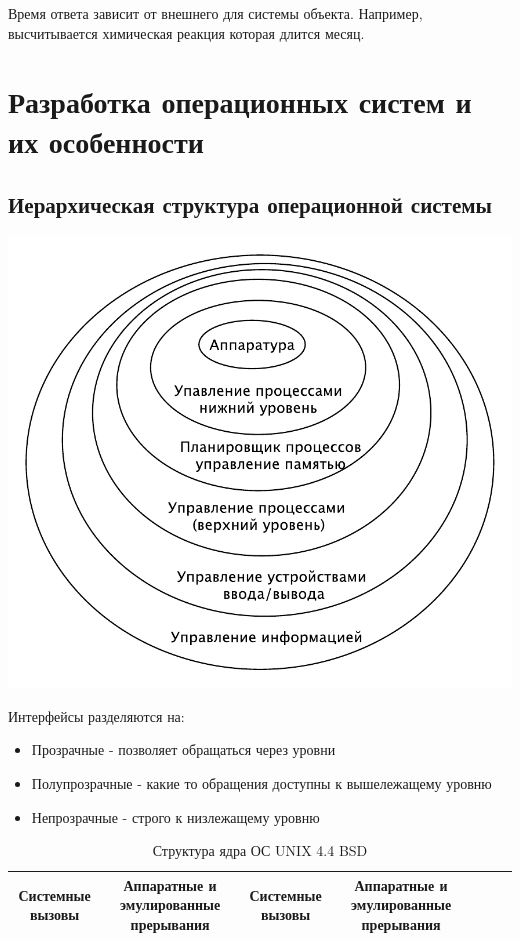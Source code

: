 \documentclass[a4paper, 14pt]{report}
\begin{document}
Время ответа зависит от внешнего для системы объекта. Например, высчитывается химическая реакция которая длится месяц.

\chapter{Разработка операционных систем и их особенности}

\section{Иерархическая структура операционной системы}

\begin{center}
    \includegraphics{os1}
\end{center}

Интерфейсы разделяются на:

\begin{itemize}
    \item Прозрачные - позволяет обращаться через уровни
    \item Полупрозрачные - какие то обращения доступны к вышележащему уровню
    \item Непрозрачные - строго к низлежащему уровню
\end{itemize}

\begin{table}
    \caption{Структура ядра ОС UNIX 4.4 BSD}
    \begin{center}
        \begin{tabular}{|c|c|c|c|c|c|c|c|c|}
            \hline
            \multicolumn{2}{|c|}{Системные вызовы} & Аппаратные и эмулированные прерывания & Системные вызовы & \multicolumn{2}{|c|}{Аппаратные и эмулированные прерывания} \\
            \hline

        \end{tabular}
\end{center}
\end{table}
\end{document}
